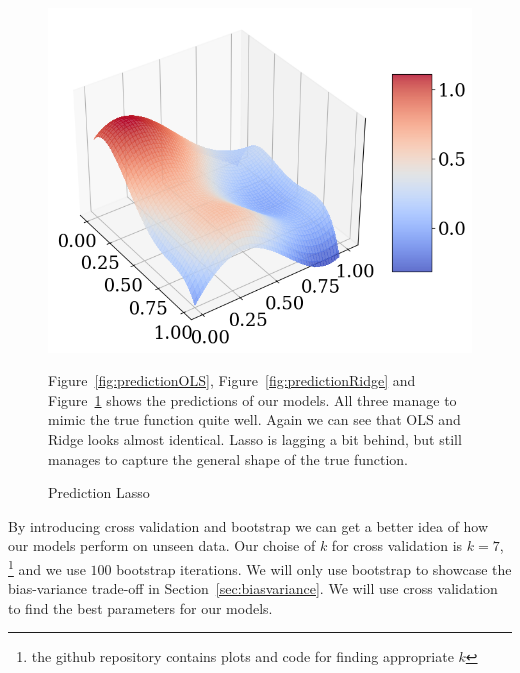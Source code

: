 \documentclass[twoside,11pt]{report}
\begin{document}
\begin{figure}[h]
\begin{minipage}[!htb]{.48\linewidth}
    \begin{center}
        \includegraphics[width=1.0\textwidth]{../runsAndAdditions/predictionLasso.png}
        \caption{Prediction Lasso}\label{fig:predictionLasso}
\end{center}
\end{minipage}
\hspace{4mm}
\begin{minipage}[!htb]{.48\linewidth}
    Figure~\ref{fig:predictionOLS}, Figure~\ref{fig:predictionRidge} and Figure~\ref{fig:predictionLasso} shows the 
    predictions of our models. All three manage to mimic the true function quite well. Again we can see that OLS and Ridge
    looks almost identical. Lasso is lagging a bit behind, but still manages to capture the general shape of the true function.
\end{minipage}
\end{figure}

By introducing cross validation and bootstrap we can get a better idea of how our models perform on unseen data.
Our choise of $k$ for cross validation is $k=7$, \footnote{the github repository contains plots and code for finding appropriate $k$}
and we use $100$ bootstrap iterations. We will only use bootstrap
to showcase the bias-variance trade-off in Section~\ref{sec:biasvariance}. We will use cross validation to find the best
parameters for our models.\\
\end{document}
